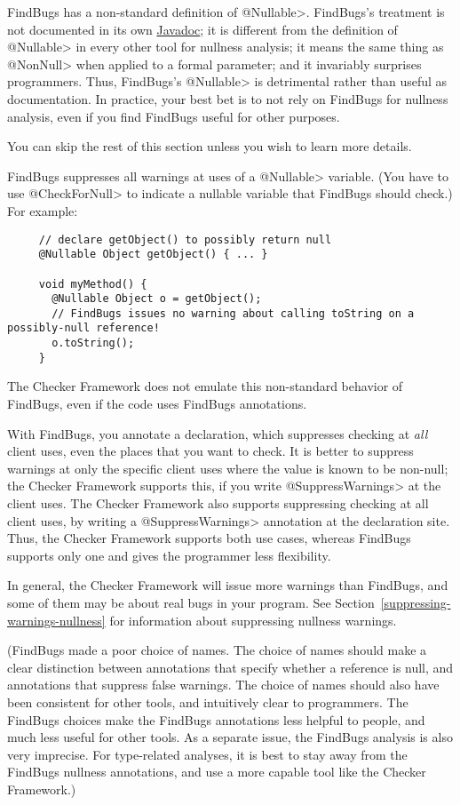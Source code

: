 FindBugs has a non-standard definition of \<@Nullable>.  FindBugs's treatment is not
documented in its own
\href{http://findbugs.sourceforge.net/api/edu/umd/cs/findbugs/annotations/Nullable.html}{Javadoc};
it is different from the definition of \<@Nullable> in every other tool for
nullness analysis; it means the same thing as \<@NonNull> when applied to a
formal parameter; and it invariably surprises programmers.  Thus, FindBugs's
\<@Nullable> is detrimental rather than useful as documentation.
In practice, your best bet is to not rely on FindBugs for nullness analysis,
even if you find FindBugs useful for other purposes.

You can skip the rest of this section unless you wish to learn more details.

FindBugs suppresses all warnings at uses of a \<@Nullable> variable.
(You have to use \<@CheckForNull> to
indicate a nullable variable that FindBugs should check.)  For example:

\begin{Verbatim}
     // declare getObject() to possibly return null
     @Nullable Object getObject() { ... }

     void myMethod() {
       @Nullable Object o = getObject();
       // FindBugs issues no warning about calling toString on a possibly-null reference!
       o.toString();
     }
\end{Verbatim}

\noindent
The Checker Framework does not emulate this non-standard behavior of
FindBugs, even if the code uses FindBugs annotations.

With FindBugs, you annotate a declaration, which suppresses checking at
\emph{all} client uses, even the places that you want to check.
It is better to suppress warnings at only the specific client uses
where the value is known to be non-null; the Checker Framework supports
this, if you write \<@SuppressWarnings> at the client uses.
The Checker Framework also supports suppressing checking at all client uses,
by writing a \<@SuppressWarnings> annotation at the declaration site.
Thus, the Checker Framework supports both use cases, whereas FindBugs
supports only one and gives the programmer less flexibility.

In general, the Checker Framework will issue more warnings than FindBugs,
and some of them may be about real bugs in your program.
See Section~\ref{suppressing-warnings-nullness} for information about
suppressing nullness warnings.

(FindBugs made a poor choice of names.  The choice of names should make a
clear distinction between annotations that specify whether a reference is
null, and annotations that suppress false warnings.  The choice of names
should also have been consistent for other tools, and intuitively clear to
programmers.  The FindBugs choices make the FindBugs annotations less
helpful to people, and much less useful for other tools.  As a separate
issue, the FindBugs
analysis is also very imprecise.  For type-related analyses, it is best to
stay away from the FindBugs nullness annotations, and use a more capable
tool like the Checker Framework.)



